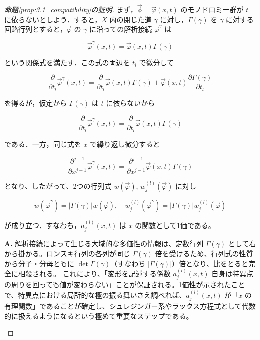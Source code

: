 \begin{proof}[命題\ref{prop:3.1_compatibility}の証明]
まず，$\vec{\phi}=\vec{\varphi}(x,t)$ のモノドロミー群が $t$ に依らないとしよう．すると，$X$ 内の閉じた道 $\gamma$ に対し，$\Gamma(\gamma)$ を $\gamma$ に対する回路行列とすると，$\vec{\varphi}$ の $\gamma$ に沿っての解析接続 $\vec{\varphi}^{\gamma}$ は

\[
  \vec{\varphi}^{\gamma}(x,t) = \vec{\varphi}(x,t)\Gamma(\gamma)
\]

という関係式を満たす．この式の両辺を $t_l$ で微分して

\begin{equation}\label{eq:3.1_monodoromy_partial_t}
  \frac{\partial}{\partial t_l}\vec{\varphi}^{\gamma}(x,t) = \frac{\partial}{\partial t_l}\vec{\varphi}(x,t)\Gamma(\gamma) + \vec{\varphi}(x,t)\frac{\partial \Gamma(\gamma)}{\partial t_l}
\end{equation}

を得るが，仮定から $\Gamma(\gamma)$ は $t$ に依らないから

\[
  \frac{\partial}{\partial t_l}\vec{\varphi}^{\gamma}(x,t) = \frac{\partial}{\partial t_l}\vec{\varphi}(x,t)\Gamma(\gamma)
\]

である．一方，同じ式を $x$ で繰り返し微分すると

\begin{equation}\label{eq:3.1_monodromy_j-1_partial_t}
  \frac{\partial^{j-1}}{\partial x^{j-1}}\vec{\varphi}^{\gamma}(x,t) = \frac{\partial^{j-1}}{\partial x^{j-1}}\vec{\varphi}(x,t)\Gamma(\gamma)
\end{equation}

となり、したがって、2つの行列式 $w(\vec{\varphi})$, $w_j^{(l)}(\vec{\varphi})$ に対し

\[
  w(\vec{\varphi}^{\gamma}) = |\Gamma(\gamma)| w(\vec{\varphi}), \quad w_j^{(l)}(\vec{\varphi}^{\gamma}) = |\Gamma(\gamma)| w_j^{(l)}(\vec{\varphi})
\]

が成り立つ．すなわち，$a_j^{(l)}(x,t)$ は $x$ の関数として1価である。

\begin{Q}
\textbf{A.} 解析接続によって生じる大域的な多価性の情報は、定数行列 $\Gamma(\gamma)$ として右から掛かる。ロンスキ行列の各列が同じ $\Gamma(\gamma)$ 倍を受けるため、行列式の性質から分子・分母ともに $\det \Gamma(\gamma)$（すなわち $|\Gamma(\gamma)|$）倍となり、比をとると完全に相殺される。
これにより、「変形を記述する係数 $a_j^{(l)}(x,t)$ 自身は特異点の周りを回っても値が変わらない」ことが保証される。1価性が示されたことで、特異点における局所的な極の振る舞いさえ調べれば、$a_j^{(l)}(x,t)$ が「$x$ の有理関数」であることが確定し、シュレジンガー系やラックス方程式として代数的に扱えるようになるという極めて重要なステップである。
\end{Q}


\end{proof}

